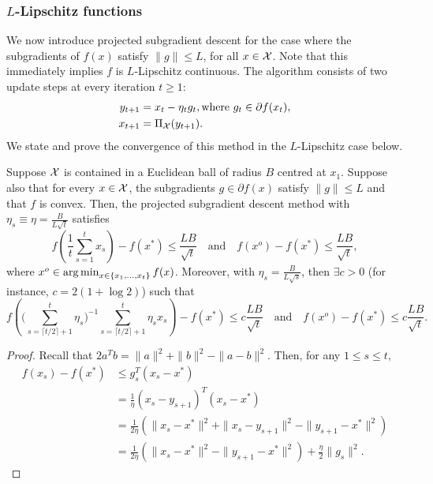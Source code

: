 \subsubsection{$L$-Lipschitz functions}
We now introduce projected subgradient descent for the case where the subgradients of $f(x)$ satisfy $\|g\| \leq L$, for all $x \in \mathcal{X}$. Note that this immediately implies $f$ is $L$-Lipschitz continuous. The algorithm consists of two update steps at every iteration $t \geq 1$:
\begin{align*}
y_{t+1} &= x_t - \eta_t g_t, \mbox{where } g_t \in \partial f(x_t), \\
x_{t+1} &= \Pi_{\mathcal{X}}(y_{t+1}).
\end{align*}
We state and prove the convergence of this method in the $L$-Lipschitz case below.
\begin{theorem}
\label{thm:projectedgradL}
Suppose $\mathcal{X}$ is contained in a Euclidean ball of radius $B$ centred at $x_1$. Suppose also that for every $x \in \mathcal{X}$, the subgradients $g \in \partial f(x)$ satisfy $\|g\| \leq L$ and that $f$ is convex. Then, the projected subgradient descent method with $\eta_s\equiv\eta = \frac{B}{L\sqrt{t}}$ satisfies 
\begin{equation} \label{eqn:proj_subgrad_t}
f\left(\frac{1}{t} \sum_{s=1}^t x_s\right) - f(x^*) \leq \frac{LB}{\sqrt{t}} \quad \mbox{and} \quad f(x^o) - f(x^*) \leq \frac{LB}{\sqrt{t}},
\end{equation}
where $x^o \in \operatorname*{arg\,min}_{x \in \{x_1, \ldots, x_t\}} f(x)$. Moreover, with $\eta_s = \frac{B}{L\sqrt{s}}$, then $\exists c > 0$ (for instance, $c=2(1+\log 2)$) such that
\begin{equation} \label{eqn:proj_subgrad_s}
f\left(\bigg(\sum_{s=\lceil t/2 \rceil + 1}^t \eta_s\bigg)^{-1} \sum_{s=\lceil t/2 \rceil + 1}^t \eta_s x_s\right) - f(x^*) \leq c\frac{LB}{\sqrt{t}} \quad \mbox{and} 
\quad f(x^o) - f(x^*) \leq c\frac{LB}{\sqrt{t}}.
\end{equation}
\begin{proof}
Recall that $2 a^T b = \|a\|^2 + \|b\|^2 - \|a - b\|^2.$ Then, for any $1 \leq s \leq t$, 
\begin{align*}
f(x_s) - f(x^*) &\leq g_s^T(x_s - x^*) \\
&= \frac{1}{\eta} (x_s - y_{s+1})^T (x_s - x^*) \\
&= \frac{1}{2\eta} \left( \|x_s - x^*\|^2 + \|x_s - y_{s+1}\|^2 - \|y_{s+1} - x^*\|^2\right) \\
&= \frac{1}{2\eta} \left( \|x_s - x^*\|^2 - \|y_{s+1} - x^*\|^2 \right) + \frac{\eta}{2} \|g_s\|^2.

\end{align*}
\end{proof}
\end{theorem}
